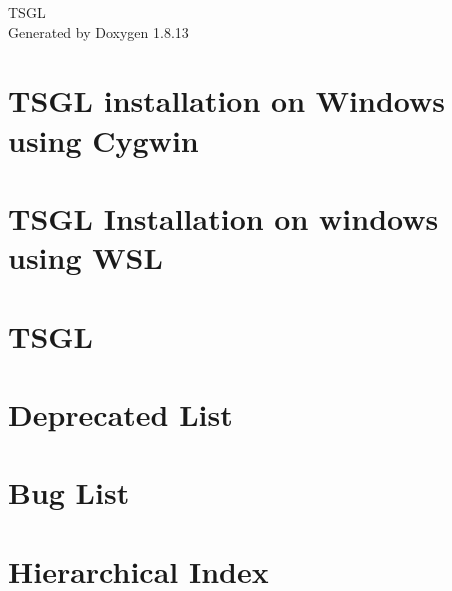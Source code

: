 \documentclass[twoside]{book}
\newcommand{\+}{\discretionary{\mbox{\scriptsize$\hookleftarrow$}}{}{}}
\newcommand{\clearemptydoublepage}{%
  \newpage{\pagestyle{empty}\cleardoublepage}%
}
\begin{document}
\hypersetup{pageanchor=false,
             bookmarksnumbered=true,
             pdfencoding=unicode
            }
\begin{titlepage}
\vspace*{7cm}
\begin{center}%
{\Large T\+S\+GL }\\
\vspace*{1cm}
{\large Generated by Doxygen 1.8.13}\\
\end{center}
\end{titlepage}
\clearemptydoublepage
{}
\tableofcontents
\clearemptydoublepage
{}
\hypersetup{pageanchor=true}

\chapter{T\+S\+GL installation on Windows using Cygwin}
\label{md__home_sth5_test__t_s_g_l__new_windows_readme_cygwin}

\chapter{T\+S\+GL Installation on windows using W\+SL}
\label{md__home_sth5_test__t_s_g_l__new_windows_readme_w_s_l}

\chapter{T\+S\+GL}
\label{md__home_sth5_test__t_s_g_l_readme}

\chapter{Deprecated List}
\label{deprecated}

\chapter{Bug List}
\label{bug}

\chapter{Hierarchical Index}

\end{document}
